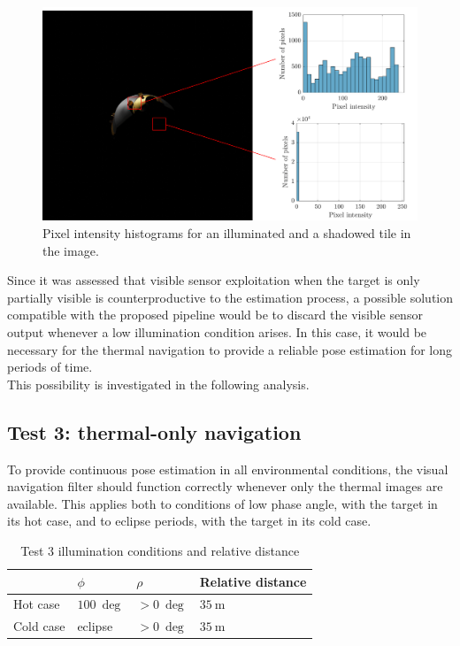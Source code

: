 \begin{figure}[!h]
    \centering
    \includegraphics[width = \linewidth]{Images/histogramsimage.png}
    \caption[Pixel intensity histograms for an illuminated and a shadowed tile]{Pixel intensity histograms for an illuminated and a shadowed tile in the image.}
    \label{fig:histograms}
\end{figure}

Since it was assessed that visible sensor exploitation when the target is only partially visible is counterproductive to the estimation process, a possible solution compatible with the proposed pipeline would be to discard the visible sensor output whenever a low illumination condition arises.  In this case, it would be necessary for the thermal navigation to provide a reliable pose estimation for long periods of time.\\
This possibility is investigated in the following analysis.

\subsection{Test 3: thermal-only navigation }

To provide continuous pose estimation in all environmental conditions, the visual navigation filter should function correctly whenever only the thermal images are available. This applies both to conditions of low phase angle, with the target in its hot case, and to eclipse periods, with the target in its cold case.\\

\begin{table}[!h]
    \centering
    \begin{tabular}{l C{1.8cm} C{1.8cm} C{4cm}}
     & $\phi$ & $\rho$ & Relative distance\\ \hline\hline
     Hot case & $\SI{100}{\deg}$ & $>\SI{0}{\deg}$ & $\SI{35}{\meter}$\\\hline
     Cold case & eclipse & $>\SI{0}{\deg}$ & $\SI{35}{\meter}$\\\hline
   
    \end{tabular}
    \caption{Test 3 illumination conditions and relative distance}
    \label{tab:contest3}
\end{table}
\vspace{-1cm}
